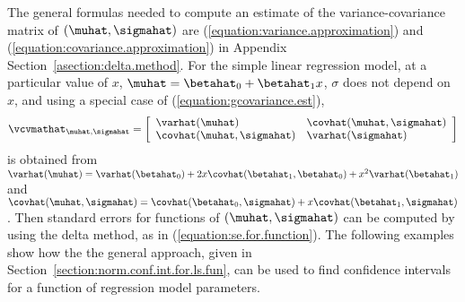 The general formulas needed to compute an estimate of the
variance-covariance matrix of $(\muhat, \sigmahat)$ are
(\ref{equation:variance.approximation}) and
(\ref{equation:covariance.approximation}) in
Appendix Section~\ref{asection:delta.method}.  For the simple linear
regression model, at a particular value of $x$, $\muhat =
\betahat_{0}+
\betahat_{1}x$, $\sigma$ does not depend on $x$, and using a special
case of (\ref{equation:gcovariance.est}),
\begin{equation}
\label{equation:ls.regr.local.est.vcv}
\vcvmathat_{\muhat,\sigmahat}=
\left[ 
\begin{array}{ll}
\varhat(\muhat)& \covhat(\muhat,\sigmahat)\\
\covhat(\muhat,\sigmahat)& \varhat(\sigmahat)
\end{array}
\right]
\end{equation}
is obtained from $\varhat(\muhat)=\varhat(\betahat_{0})+2x
\covhat(\betahat_{1},\betahat_{0})+ x^{2} \varhat(\betahat_{1}) $ and
$\covhat(\muhat,\sigmahat)=
\covhat(\betahat_{0},\sigmahat) + x \covhat(\betahat_{1}, \sigmahat)$.
Then standard errors for functions of $(\muhat, \sigmahat)$ can be
computed by using the delta method, as in
(\ref{equation:se.for.function}).  The following examples show how the
the general approach, given in
Section~\ref{section:norm.conf.int.for.ls.fun}, can be used to find
confidence intervals for a function of regression model parameters.

